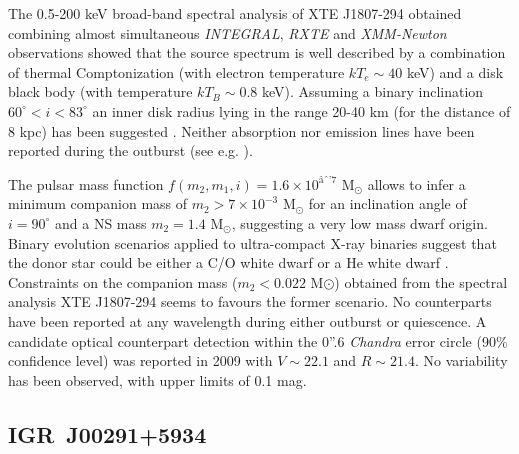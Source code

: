 \documentclass[graybox]{svmult}
\def \inte {{\em INTEGRAL\xspace}}
\def \chandra {{\em Chandra\xspace}}
\def \xmm {{\em XMM-Newton\xspace}}
\def \rxte {{\em RXTE\xspace}}
\begin{document}
The 0.5-200 keV broad-band spectral analysis of XTE J1807-294 obtained combining almost simultaneous \inte{}, \rxte{} and \xmm{} observations showed that the source spectrum is well described by a combination of thermal Comptonization (with electron temperature $kT_e\sim40$ keV) and a disk black body (with temperature $kT_B\sim0.8$ keV). Assuming a binary inclination $60^\circ<i<83^\circ$ an inner disk radius lying in the range 20-40 km (for the distance of 8 kpc) has been suggested \cite{Falanga2005a}. Neither absorption nor emission lines have been reported during the outburst (see e.g. \cite{Campana2003}). 

The pulsar mass function $f(m_2,m_1,i) = 1.6\times10^{â7}$ M$_\odot$ allows to infer a minimum companion mass of $m_2>7\times 10^{-3}$ M$_\odot$ for an inclination angle of $i = 90^\circ$ and a NS mass $m_2=1.4$ M$_\odot$, suggesting a very low mass dwarf origin. Binary evolution scenarios applied to ultra-compact X-ray binaries suggest that the donor star could be either a C/O white dwarf or a He white dwarf \cite{Deloye2003}. Constraints on the companion mass ($m_2<0.022$ M$\odot$) obtained from the spectral analysis XTE J1807-294 \cite{Falanga2005a} seems to favours the former scenario. No counterparts have been reported at any wavelength during either outburst or quiescence. A candidate optical counterpart detection within the 0''.6 \chandra{} error circle (90\% confidence level) was reported in 2009 \cite{DAvanzo2009} with $V\sim22.1$ and $R\sim21.4$. No variability has been observed, with upper limits of 0.1 mag.



\subsection{IGR~J00291+5934}
\end{document}
